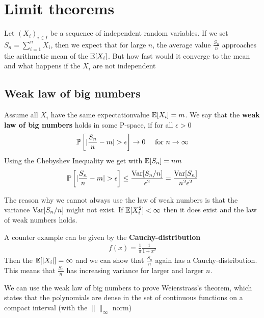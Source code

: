 \section{Limit theorems}
Let $(X_i)_{i \in I}$ be a sequence of independent random variables. If we set $S_n = \sum_{i=1}^{n}X_i$, then we expect that for large $n$, the average value $\frac{S_n}{n}$ approaches the arithmetic mean of the $\mathbb{E}[X_{i}]$.
But how fast would it converge to the mean and what happens if the $X_i$ are not independent


\subsection{Weak law of big numbers}
Assume all $X_i$ have the same expectationvalue $\mathbb{E}[X_i] = m$.
We say that the \textbf{weak law of big numbers} holds in some P-space, if for all $\epsilon > 0$
\begin{align*}
  \mathbb{P}\left[\vert\frac{S_n}{n} - m\vert > \epsilon\right] \to 0 \quad \text{ for } n \to \infty
\end{align*}
Using the Chebyshev Inequality we get with $\mathbb{E}[S_n] = nm$ 
\begin{align*}
  \mathbb{P}\left[
  \vert\frac{S_n}{n}- m\vert > \epsilon\right] \leq \frac{\text{Var}[S_n/n]}{\epsilon^{2}} = \frac{\text{Var}[S_n]}{n^{2}\epsilon^{2}}
\end{align*}

The reason why we cannot always use the law of weak numbers is that the variance $\operatorname{Var}[S_n/n]$ might not exist.
If $\mathbb{E}[X_i^{2}] < \infty$ then it does exist and the law of weak numbers holds.

\begin{ex}[]
A counter example can be given by the \textbf{Cauchy-distribution}
\begin{align*}
  f(x) = \frac{1}{\pi} \frac{1}{1+x^{2}}
\end{align*}
Then the $\mathbb{E}[\vert X_i\vert] = \infty$ and we can show that $\tfrac{S_n}{n}$ again has a Cauchy-distribution.
This means that $\tfrac{S_n}{n}$ has increasing variance for larger and larger $n$.
\end{ex}


We can use the weak law of big numbers to prove Weierstrass's theorem, which states that the polynomials are dense in the set of continuous functions on a compact interval (with the $\|\|_{\infty}$ norm)

